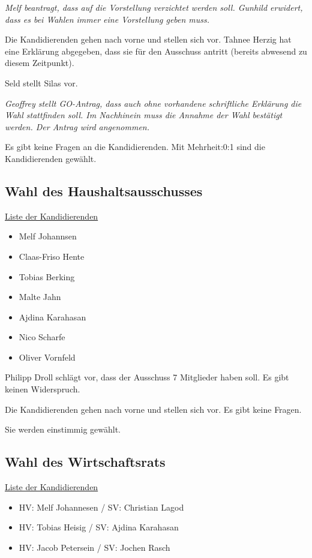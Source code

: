 \documentclass[ngerman,headheight=70pt]{scrartcl}
\begin{document}
    \textit{Melf beantragt, dass auf die Vorstellung verzichtet werden soll.
    Gunhild erwidert, dass es bei Wahlen immer eine Vorstellung geben muss.}

    Die Kandidierenden gehen nach vorne und stellen sich vor. Tahnee Herzig hat
    eine Erklärung abgegeben, dass sie für den Ausschuss antritt (bereits
    abwesend zu diesem Zeitpunkt).

    Seld stellt Silas vor.

    \textit{Geoffrey stellt GO-Antrag, dass auch ohne vorhandene schriftliche
    Erklärung die Wahl stattfinden soll. Im Nachhinein muss die Annahme
    der Wahl bestätigt werden. Der Antrag wird angenommen.}

    Es gibt keine Fragen an die Kandidierenden. Mit Mehrheit:0:1 sind die
    Kandidierenden gewählt.

    \subsection{Wahl des Haushaltsausschusses}

    \underline{Liste der Kandidierenden}
    \begin{itemize}
        \item Melf Johannsen
        \item Claas-Friso Hente
        \item Tobias Berking
        \item Malte Jahn
        \item Ajdina Karahasan
        \item Nico Scharfe
        \item Oliver Vornfeld
    \end{itemize}

    Philipp Droll schlägt vor, dass der Ausschuss 7 Mitglieder haben soll.
    Es gibt keinen Widerspruch.

    Die Kandidierenden gehen nach vorne und stellen sich vor. Es gibt keine
    Fragen.

    Sie werden einstimmig gewählt.

    \subsection{Wahl des Wirtschaftsrats}

    \underline{Liste der Kandidierenden}
    \begin{itemize}
        \item HV: Melf Johannesen / SV: Christian Lagod
        \item HV: Tobias Heisig / SV: Ajdina Karahasan
        \item HV: Jacob Petersein / SV: Jochen Rasch
    \end{itemize}
\end{document}
